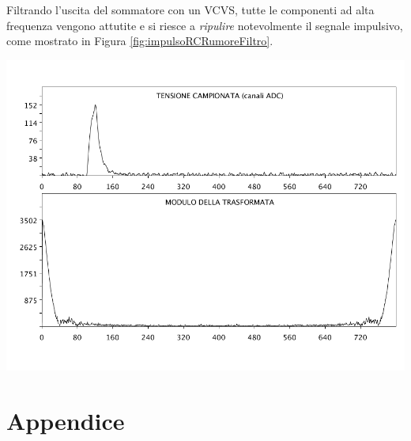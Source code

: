 \documentclass[10pt,oneside,a4paper]{article}
\newenvironment{Figure}
  {\par\medskip\noindent\minipage{\linewidth}}
  {\endminipage\par\medskip}
\begin{document}
\begin{multicols}{2}
Filtrando l'uscita del sommatore con un VCVS, tutte le componenti ad alta frequenza vengono attutite e si riesce a \emph{ripulire} notevolmente il segnale impulsivo, come mostrato in Figura \ref{fig:impulsoRCRumoreFiltro}.
\begin{Figure}
	\begin{center}
	\includegraphics[width=\linewidth]{impulsoRCRumoreFiltro}
	\label{fig:impulsoRCRumoreFiltro}
	\end{center}
\end{Figure}

\end{multicols}
\newpage
\section{Appendice}


%
%
%


\end{document}
